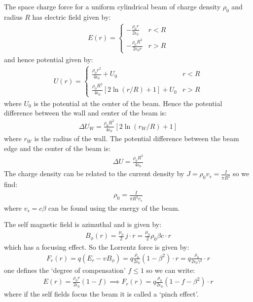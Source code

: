\documentclass{article}
\numberwithin{equation}{section}
\begin{document}
The space charge force for a uniform cylindrical beam of charge density $\rho_0$ and radius $R$ has electric field given by:
\begin{align}
E(r) = \begin{cases}
-\frac{\rho_0 r}{2 \epsilon_0} & r<R \\
-\frac{\rho_0 R^2}{2 \epsilon_0 r} & r>R
\end{cases}
\end{align}
and hence potential given by:
\begin{align}
U(r) = \begin{cases}
\frac{\rho_0 r^2}{4 \epsilon_0} + U_0 & r<R \\
\frac{\rho_0 R^2}{4 \epsilon_0 } \left[ 2 \ln(r/R)+1 \right] + U_0 & r>R
\end{cases}
\end{align}
where $U_0$ is the potential at the center of the beam. Hence the potential difference between the wall and center of the beam is:
\begin{align}
\Delta U_W = \frac{\rho_0 R^2}{4 \epsilon_0 } \left[ 2 \ln(r_W/R)+1 \right] 
\end{align}
where $r_W$ is the radius of the wall. The potential difference between the beam edge and the center of the beam is:
\begin{align}
\Delta U = \frac{\rho_0 R^2}{4 \epsilon_0 } 
\end{align}
The charge density can be related to the current density by $J = \rho_0 v_s = \frac{I}{\pi R^2}$ so we find:
\begin{align}
\rho_0 = \frac{I}{\pi R^2 v_s}
\end{align}
where $v_s = c \beta$ can be found using the energy of the beam.

The self magnetic field is azimuthal and is given by:
\begin{align}
B_\phi(r) = \frac{\mu_0}{2}\, j \cdot r = \frac{\mu_0}{2}\rho_0 \beta c \cdot r
\end{align}
which has a focusing effect. So the Lorrentz force is given by:
\begin{align}
F_r(r) = q(E_r - vB_\phi) = q \frac{\rho_0}{2 \epsilon_0}(1-\beta^2 ) \cdot r = q \frac{\rho_0}{2 \epsilon_0 \gamma^2 } \cdot r 
\end{align}
one defines the `degree of compensation' $f \leq 1$ so we can write:
\begin{align}
E(r) = \frac{\rho_0 r}{2 \epsilon_0}(1-f) \implies F_r(r) = q \frac{\rho_0}{2\epsilon_0}(1-f-\beta^2)\cdot r 
\end{align}
where if the self fields focus the beam it is called a `pinch effect'.
\end{document}
